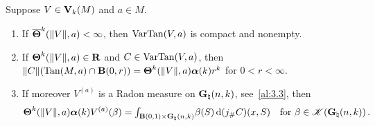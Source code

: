\begin{lemma}
    \label{al:3.4(1)}
    Suppose $V \in \mathbf{V}_{k}(M)$ and $a \in M$.
    \begin{enumerate}
        \item If $\boldsymbol{\overline{\Theta}}^{k}(\|V\|,a) < \infty$, then $\operatorname{VarTan}(V,a)$ is compact and
            nonempty.
        \item If $\boldsymbol{\Theta}^{k}(\|V\|,a) \in \mathbf{R}$ and $C \in \operatorname{VarTan}(V,a)$, then $\|C\|(\operatorname{Tan}(M,a)
            \cap \mathbf{B}(0,r)) = \boldsymbol{\Theta}^{k}(\|V\|,a) \boldsymbol{\alpha}(k) r^{k}$ for $0 < r <
            \infty$.
        \item If moreover $V^{(a)}$ is a Radon measure on $\mathbf{G}_{\natural}(n,k)$, see~\ref{al:3.3},
            then
            \begin{displaymath}
                \boldsymbol{\Theta}^{k}(\|V\|,a) \boldsymbol{\alpha}(k) V^{(a)}(\beta) = {\textstyle\int_{\mathbf{B}(0,1)
                \times \mathbf{G}_{\natural}(n,k)}^{}} \beta(S) \,\mathrm{d} (j_\# C)(x,S) \quad \text{for $\beta
                \in \mathscr{K}(\mathbf{G}_{\natural}(n,k))$} \,.
            \end{displaymath}
    \end{enumerate}
\end{lemma}

